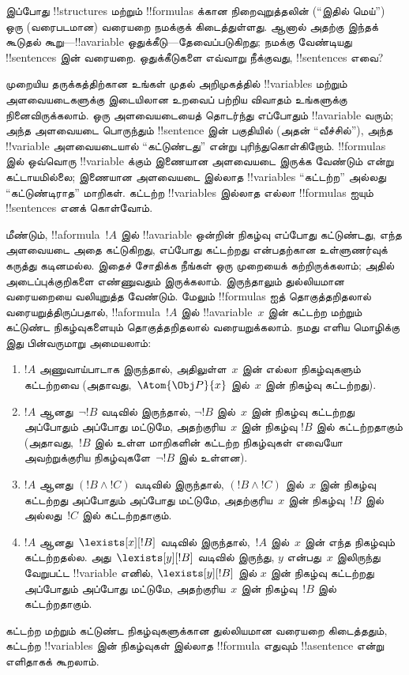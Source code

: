 \documentclass[../../../include/open-logic-section]{subfiles}
\begin{document}


இப்போது !!{structure}s மற்றும் !!{formula}s க்கான நிறைவுறுத்தலின் (``இதில்
மெய்'') ஒரு (வரைபடமான) வரையறை நமக்குக் கிடைத்துள்ளது. ஆனால் அதற்கு இந்தக்
கூடுதல் கூறு---!!a{variable} ஒதுக்கீடு---தேவைப்படுகிறது; நமக்கு வேண்டியது
!!{sentence}s இன் வரையறை. ஒதுக்கீடுகளை எவ்வாறு நீக்குவது, !!{sentence}s
எவை?

முறையிய தருக்கத்திற்கான உங்கள் முதல் அறிமுகத்தில் !!{variable}s மற்றும்
அளவையடைகளுக்கு இடையிலான உறவைப் பற்றிய விவாதம் உங்களுக்கு நினைவிருக்கலாம்.
ஒரு அளவையடையைத் தொடர்ந்து எப்போதும் !!a{variable} வரும்; அந்த அளவையடை
பொருந்தும் !!{sentence} இன் பகுதியில் (அதன் ``வீச்சில்''), அந்த !!{variable}
அளவையடையால் ``கட்டுண்டது'' என்று புரிந்துகொள்கிறோம். !!{formula}s இல்
ஒவ்வொரு !!{variable} க்கும் இணையான அளவையடை இருக்க வேண்டும் என்று
கட்டாயமில்லை; இணையான அளவையடை இல்லாத !!{variable}s ``கட்டற்ற'' அல்லது
``கட்டுண்டிராத'' மாறிகள். கட்டற்ற !!{variable}s இல்லாத எல்லா !!{formula}s ஐயும்
!!{sentence}s எனக் கொள்வோம்.

மீண்டும், !!a{formula}~$!A$ இல் !!a{variable} ஒன்றின் நிகழ்வு எப்போது
கட்டுண்டது, எந்த அளவையடை அதை கட்டுகிறது, எப்போது கட்டற்றது என்பதற்கான
உள்ளுணர்வுக் கருத்து கடினமல்ல. இதைச் சோதிக்க நீங்கள் ஒரு முறையைக் கற்றிருக்கலாம்;
அதில் அடைப்புக்குறிகளை எண்ணுவதும் இருக்கலாம். இருந்தாலும் துல்லியமான
வரையறையை வலியுறுத்த வேண்டும். மேலும் !!{formula}s ஐத் தொகுத்தறிதலால்
வரையறுத்திருப்பதால், !!a{formula}~$!A$ இல் !!a{variable}~$x$ இன் கட்டற்ற மற்றும்
கட்டுண்ட நிகழ்வுகளையும் தொகுத்தறிதலால் வரையறுக்கலாம். நமது எளிய மொழிக்கு இது
பின்வருமாறு அமையலாம்:
\begin{enumerate}
  \item $!A$ அணுவாய்பாடாக இருந்தால், அதிலுள்ள~$x$ இன் எல்லா நிகழ்வுகளும்
  கட்டற்றவை (அதாவது,~$\Atom{\Obj P}{x}$ இல்~$x$ இன் நிகழ்வு கட்டற்றது).
  \item $!A$ ஆனது~$\lnot !B$ வடிவில் இருந்தால், $\lnot !B$ இல்~$x$ இன்
  நிகழ்வு கட்டற்றது அப்போதும் அப்போது மட்டுமே, அதற்குரிய~$x$ இன் நிகழ்வு
  $!B$ இல் கட்டற்றதாகும் (அதாவது,~$!B$ இல் உள்ள மாறிகளின் கட்டற்ற நிகழ்வுகள்
  எவையோ அவற்றுக்குரிய நிகழ்வுகளே~$\lnot !B$ இல் உள்ளன).
  \item $!A$ ஆனது $(!B \land !C)$ வடிவில் இருந்தால்,
  $(!B \land !C)$ இல்~$x$ இன் நிகழ்வு கட்டற்றது அப்போதும் அப்போது மட்டுமே,
  அதற்குரிய~$x$ இன் நிகழ்வு~$!B$ இல் அல்லது~$!C$ இல் கட்டற்றதாகும்.
  \item $!A$ ஆனது~$\lexists[x][!B]$ வடிவில் இருந்தால்,~$!A$ இல்~$x$ இன்
  எந்த நிகழ்வும் கட்டற்றதல்ல. அது~$\lexists[y][!B]$ வடிவில் இருந்து, $y$
  என்பது~$x$ இலிருந்து வேறுபட்ட !!{variable} எனில், $\lexists[y][!B]$ இல்
  $x$ இன் நிகழ்வு கட்டற்றது அப்போதும் அப்போது மட்டுமே, அதற்குரிய~$x$ இன்
  நிகழ்வு~$!B$ இல் கட்டற்றதாகும்.
\end{enumerate}

கட்டற்ற மற்றும் கட்டுண்ட நிகழ்வுகளுக்கான துல்லியமான வரையறை கிடைத்ததும்,
கட்டற்ற !!{variable}s இன் நிகழ்வுகள் இல்லாத !!{formula} எதுவும் !!a{sentence}
என்று எளிதாகக் கூறலாம்.
\end{document}

